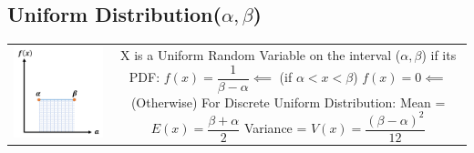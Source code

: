 \documentclass[8pt]{report}
\begin{document}
		\subsection{Uniform Distribution($\alpha,\beta$)}
			\begin{table}[H]
				\centering
				\def\arraystretch{1.5}
				\begin{tabular}{cc}
					\parbox{3cm}{\includegraphics[scale=0.4]{uniformdistribution.png}} & \hspace{1cm}
					\parbox{12cm}{X is a Uniform Random Variable on the interval ($\alpha,\beta$) if its PDF:\\\\$\boxed{f(x) = \dfrac{1}{\beta-\alpha}}\impliedby$ (if $\alpha < x <\beta$) \hspace{0.5cm}$\boxed{f(x) = 0}\impliedby$ (Otherwise)\\\\\\For Discrete Uniform Distribution:\\\\\hspace{1cm}Mean = $\boxed{E(x) = \dfrac{\beta+\alpha}{2}}$ \hspace{0.5cm} Variance = $\boxed{V(x) = \dfrac{(\beta-\alpha)^2}{12}}$}
				\end{tabular}							
			\end{table}\hrulefill
\end{document}
